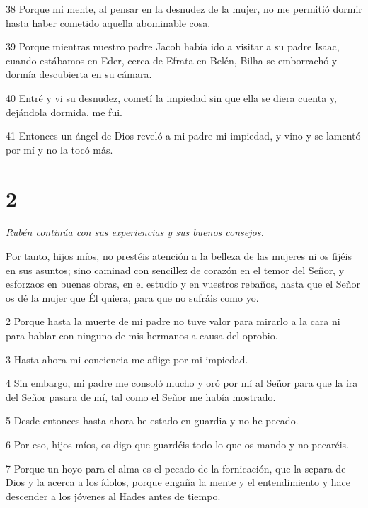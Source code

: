 \par 38 Porque mi mente, al pensar en la desnudez de la mujer, no me permitió dormir hasta haber cometido aquella abominable cosa.

\par 39 Porque mientras nuestro padre Jacob había ido a visitar a su padre Isaac, cuando estábamos en Eder, cerca de Efrata en Belén, Bilha se emborrachó y dormía descubierta en su cámara.

\par 40 Entré y vi su desnudez, cometí la impiedad sin que ella se diera cuenta y, dejándola dormida, me fui.

\par 41 Entonces un ángel de Dios reveló a mi padre mi impiedad, y vino y se lamentó por mí y no la tocó más.

\chapter{2}

\par \textit{Rubén continúa con sus experiencias y sus buenos consejos.}

Por tanto, hijos míos, no prestéis atención a la belleza de las mujeres ni os fijéis en sus asuntos; sino caminad con sencillez de corazón en el temor del Señor, y esforzaos en buenas obras, en el estudio y en vuestros rebaños, hasta que el Señor os dé la mujer que Él quiera, para que no sufráis como yo.

\par 2 Porque hasta la muerte de mi padre no tuve valor para mirarlo a la cara ni para hablar con ninguno de mis hermanos a causa del oprobio.

\par 3 Hasta ahora mi conciencia me aflige por mi impiedad.

\par 4 Sin embargo, mi padre me consoló mucho y oró por mí al Señor para que la ira del Señor pasara de mí, tal como el Señor me había mostrado.

\par 5 Desde entonces hasta ahora he estado en guardia y no he pecado.

\par 6 Por eso, hijos míos, os digo que guardéis todo lo que os mando y no pecaréis.

\par 7 Porque un hoyo para el alma es el pecado de la fornicación, que la separa de Dios y la acerca a los ídolos, porque engaña la mente y el entendimiento y hace descender a los jóvenes al Hades antes de tiempo.

